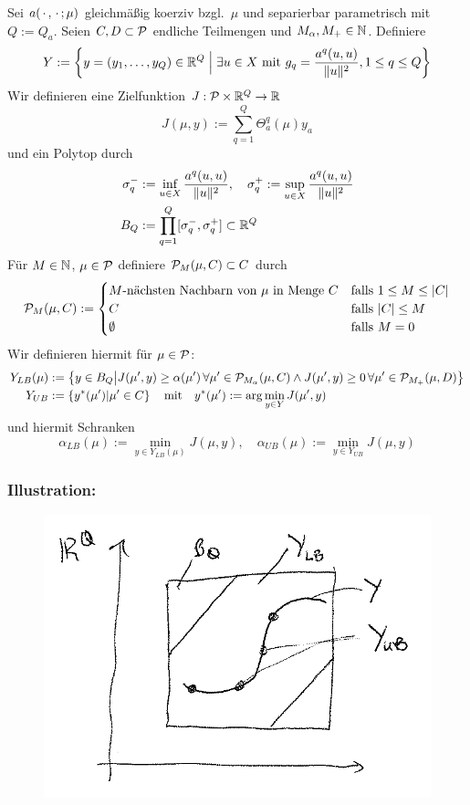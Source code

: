 \begin{defn}[SCM]
	Sei $a(\,\cdot\,,\,\cdot\,;\mu)$ gleichmäßig koerziv bzgl.\ $\mu$ und separierbar parametrisch mit $Q := Q_a$.
	Seien $C, D \subset \mathcal{P}$ endliche Teilmengen und $M_\alpha, M_+ \in \mathbb{N}$.
	Definiere
	\[
		Y := \left\{y = (y_1,\ldots,y_Q) \in \mathbb{R}^Q \;\Big|\; \exists u \in X \text{ mit } g_q = \frac{a^q(u,u)}{\|u\|^2}, 1 \leq q \leq Q\right\}
	\]
	Wir definieren eine Zielfunktion $J : \mathcal{P} \times \mathbb{R}^Q \to \mathbb{R}$
	\[
		J(\mu,y) := \sum_{q=1}^Q \Theta_a^q(\mu) y_a
	\]
	und ein Polytop durch
	\begin{align*}
		\sigma_q^- &:= \inf_{u \in X} \frac{a^q(u,u)}{\|u\|^2}, \quad \sigma_q^+ := \sup_{u \in X} \frac{a^q(u,u)}{\|u\|^2}\\
		B_Q &:= \prod_{q=1}^Q [\sigma_q^-,\sigma_q^+] \subset \mathbb{R}^Q
	\end{align*}
	Für $M \in \mathbb{N}$, $\mu \in \mathcal{P}$ definiere $\mathcal{P}_M(\mu,C) \subset C$ durch
	\[
		\mathcal{P}_M(\mu,C) := \begin{cases}
			\text{$M$-nächsten Nachbarn von $\mu$ in Menge $C$} & \text{falls } 1 \leq M \leq |C|\\
			C & \text{falls } |C| \leq M\\
			\emptyset & \text{falls } M = 0
		\end{cases}
	\]
	Wir definieren hiermit für $\mu \in \mathcal{P}$:
	\begin{align*}
		Y_{LB}(\mu) &:= \left\{y \in B_Q \big| J(\mu',y) \geq \alpha(\mu') \, \forall \mu' \in \mathcal{P}_{M_\alpha}(\mu,C) \wedge J(\mu',y) \geq 0 \, \forall \mu' \in \mathcal{P}_{M_+}(\mu,D)\right\}\\
		Y_{UB} &:= \left\{y^*(\mu') | \mu' \in C\right\} \quad \text{mit} \quad y^*(\mu') := \arg\min_{y \in Y} J(\mu',y)
	\end{align*}
	und hiermit Schranken
	\[
		\alpha_{LB}(\mu) := \min_{y \in Y_{LB}(\mu)} J(\mu,y), \quad \alpha_{UB}(\mu) := \min_{y \in Y_{UB}} J(\mu,y)
	\]
\end{defn}

\subsubsection*{Illustration:}
\begin{figure}[H]
	\centering\small
	\includegraphics[width = 0.5 \textwidth]{Bilder/scm.png}
\end{figure}

